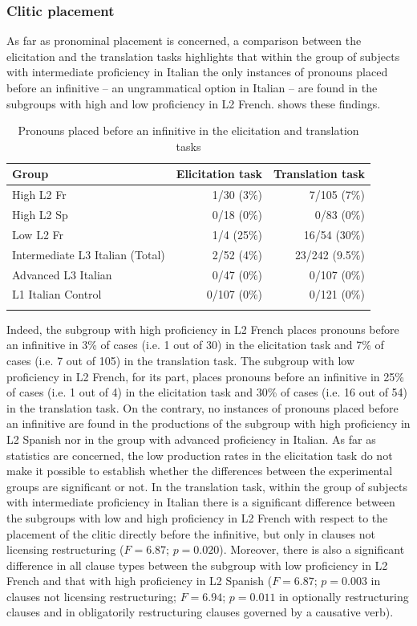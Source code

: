 \documentclass[output=paper,modfonts,nonflat,newtxmath]{langsci/langscibook}
\begin{document}
\subsubsection{Clitic placement} %

As far as pronominal placement is concerned, a comparison between the elicitation and the translation tasks highlights that within the group of subjects with intermediate proficiency in Italian the only instances of pronouns placed before an infinitive – an ungrammatical option in Italian – are found in the subgroups with high and low proficiency in L2 French.  shows these findings.

\begin{table}
\caption{\label{tab:sciutti:6}Pronouns placed before an infinitive in the elicitation and translation tasks}
\begin{tabular}{lrr}
\lsptoprule
Group & Elicitation task & Translation task\\
\midrule
High L2 Fr & 1/30 (3\%) & 7/105 (7\%)\\
High L2 Sp & 0/18 (0\%) & 0/83 (0\%)\\
Low L2 Fr & 1/4 (25\%) & 16/54 (30\%)\\
Intermediate L3 Italian (Total) & 2/52 (4\%) & 23/242 (9.5\%)\\
Advanced L3 Italian & 0/47 (0\%) & 0/107 (0\%)\\
L1 Italian Control & 0/107 (0\%) & 0/121 (0\%)\\
\lspbottomrule
\end{tabular}
\end{table}

Indeed, the subgroup with high proficiency in L2 French places pronouns before an infinitive in 3\% of cases (i.e. 1 out of 30) in the elicitation task and 7\% of cases (i.e. 7 out of 105) in the translation task. The subgroup with low proficiency in L2 French, for its part, places pronouns before an infinitive in 25\% of cases (i.e. 1 out of 4) in the elicitation task and 30\% of cases (i.e. 16 out of 54) in the translation task. On the contrary, no instances of pronouns placed before an infinitive are found in the productions of the subgroup with high proficiency in L2 Spanish nor in the group with advanced proficiency in Italian. As far as statistics are concerned, the low production rates in the elicitation task do not make it possible to establish whether the differences between the experimental groups are significant or not. In the translation task, within the group of subjects with intermediate proficiency in Italian there is a significant difference between the subgroups with low and high proficiency in L2 French with respect to the placement of the clitic directly before the infinitive, but only in clauses not licensing restructuring ($F = 6.87$; $p = 0.020$). Moreover, there is also a significant difference in all clause types between the subgroup with low proficiency in L2 French and that with high proficiency in L2 Spanish ($F = 6.87$; $p = 0.003$ in clauses not licensing restructuring; $F = 6.94$; $p = 0.011$ in optionally restructuring clauses and in obligatorily restructuring clauses governed by a causative verb).
\end{document}

